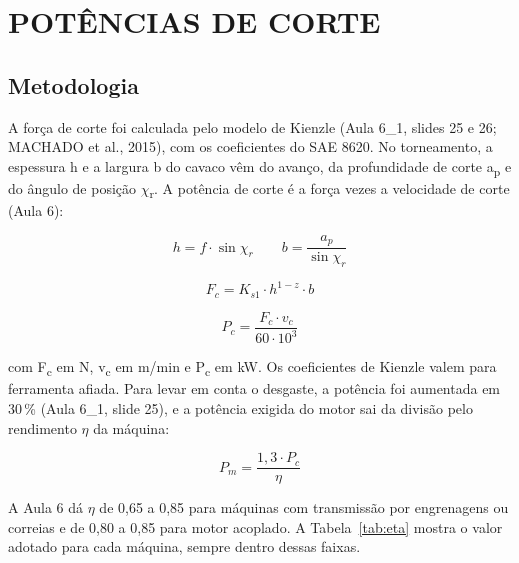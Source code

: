 \chapter{POTÊNCIAS DE CORTE}\label{cap:pot}

\section{Metodologia}

A força de corte foi calculada pelo modelo de Kienzle (Aula 6\_1, slides 25 e 26; MACHADO et al., 2015), com os coeficientes do SAE 8620. No torneamento, a espessura h e a largura b do cavaco vêm do avanço, da profundidade de corte a\textsubscript{p} e do ângulo de posição $\chi$\textsubscript{r}. A potência de corte é a força vezes a velocidade de corte (Aula 6):

\begin{equation}\label{eq:hb}
  h = f \cdot \sin \chi_{r} \qquad b = \frac{a_{p}}{\sin \chi_{r}}
\end{equation}

\begin{equation}\label{eq:kienzle}
  F_{c} = K_{s1} \cdot h^{1-z} \cdot b
\end{equation}

\begin{equation}\label{eq:pc}
  P_{c} = \frac{F_{c} \cdot v_{c}}{60 \cdot 10^{3}}
\end{equation}

com F\textsubscript{c} em N, v\textsubscript{c} em m/min e P\textsubscript{c} em kW. Os coeficientes de Kienzle valem para ferramenta afiada. Para levar em conta o desgaste, a potência foi aumentada em 30\,\% (Aula 6\_1, slide 25), e a potência exigida do motor sai da divisão pelo rendimento $\eta$ da máquina:

\begin{equation}\label{eq:pm}
  P_{m} = \frac{1,3 \cdot P_{c}}{\eta}
\end{equation}

A Aula 6 dá $\eta$ de 0,65 a 0,85 para máquinas com transmissão por engrenagens ou correias e de 0,80 a 0,85 para motor acoplado. A Tabela~\ref{tab:eta} mostra o valor adotado para cada máquina, sempre dentro dessas faixas.

